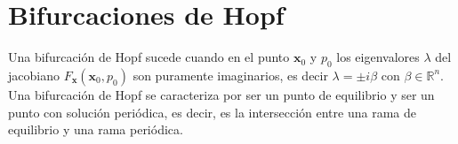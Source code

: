 \documentclass[10pt,a4paper]{article}
\begin{document}
\section{Bifurcaciones de Hopf}

Una bifurcación de Hopf sucede cuando en el punto \( \mathbf{x}_{0} \) y \( p_{0} \) los eigenvalores \( \lambda \) del jacobiano \( F_{\mathbf{x}}(\mathbf{x}_{0}, p_{0}) \) son puramente imaginarios, es decir \( \lambda = \pm i \beta \) con \( \beta \in \mathbb{R}^{n} \).\\

Una bifurcación de Hopf se caracteriza por ser un punto de equilibrio y ser un punto con solución periódica, es decir, es la intersección entre una rama de equilibrio y una rama periódica.

\printbibliography
\end{document}
